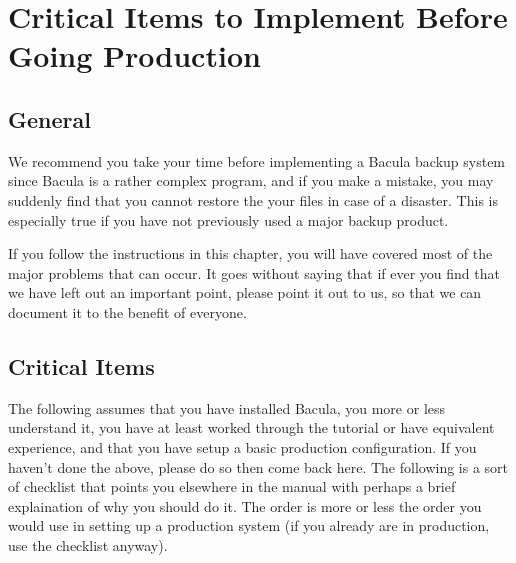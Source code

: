 
\section*{Critical Items to Implement Before Going Production}
\label{_ChapterStart32}

\subsection*{General}

We recommend you take your time before implementing a Bacula backup system
since Bacula is a rather complex program, and if you make a mistake, you may
suddenly find that you cannot restore the your files in case of a disaster.
This is especially true if you have not previously used a major backup
product. 

If you follow the instructions in this chapter, you will have covered most of
the major problems that can occur. It goes without saying that if ever you
find that we have left out an important point, please point it out to us, so
that we can document it to the benefit of everyone. 

\label{Critical}
\subsection*{Critical Items}

The following assumes that you have installed Bacula, you more or less
understand it, you have at least worked through the tutorial or have
equivalent experience, and that you have setup a basic production
configuration. If you haven't done the above, please do so then come back
here. The following is a sort of checklist that points you elsewhere in the
manual with perhaps a brief explaination of why you should do it. The order is
more or less the order you would use in setting up a production system (if you
already are in production, use the checklist anyway). 

